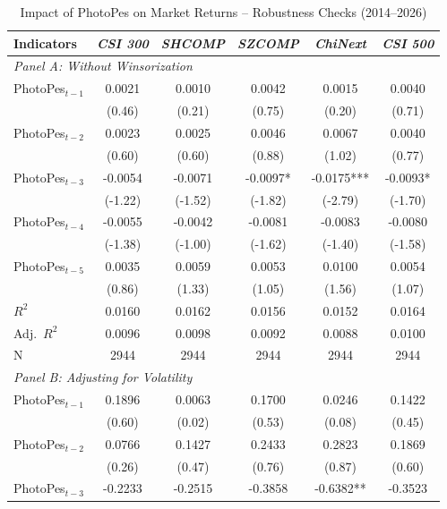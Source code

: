 \documentclass[AER]{AEA}
\begin{document}
\begin{table}[h!]
    \centering
    \caption{Impact of PhotoPes on Market Returns -- Robustness Checks (2014--2026)}
    \label{tab:robustness}
    \setlength{\tabcolsep}{4pt} %
    \footnotesize
    \begin{tabular}{lccccc}
    \toprule
    Indicators & \textit{CSI 300} & \textit{SHCOMP} & \textit{SZCOMP} & \textit{ChiNext} & \textit{CSI 500} \\
    \midrule
    \multicolumn{6}{l}{\textit{Panel A: Without Winsorization}} \\
    \midrule
    PhotoPes$_{t-1}$ & 0.0021 & 0.0010 & 0.0042 & 0.0015 & 0.0040 \\
         & (0.46) & (0.21) & (0.75) & (0.20) & (0.71) \\
    PhotoPes$_{t-2}$ & 0.0023 & 0.0025 & 0.0046 & 0.0067 & 0.0040 \\
         & (0.60) & (0.60) & (0.88) & (1.02) & (0.77) \\
    PhotoPes$_{t-3}$ & -0.0054 & -0.0071 & -0.0097* & -0.0175*** & -0.0093* \\
         & (-1.22) & (-1.52) & (-1.82) & (-2.79) & (-1.70) \\
    PhotoPes$_{t-4}$ & -0.0055 & -0.0042 & -0.0081 & -0.0083 & -0.0080 \\
         & (-1.38) & (-1.00) & (-1.62) & (-1.40) & (-1.58) \\
    PhotoPes$_{t-5}$ & 0.0035 & 0.0059 & 0.0053 & 0.0100 & 0.0054 \\
         & (0.86) & (1.33) & (1.05) & (1.56) & (1.07) \\
    $R^2$ & 0.0160 & 0.0162 & 0.0156 & 0.0152 & 0.0164 \\
    Adj.\ $R^2$ & 0.0096 & 0.0098 & 0.0092 & 0.0088 & 0.0100 \\
    N & 2944 & 2944 & 2944 & 2944 & 2944 \\
    \midrule
    \multicolumn{6}{l}{\textit{Panel B: Adjusting for Volatility}} \\
    \midrule
    PhotoPes$_{t-1}$ & 0.1896 & 0.0063 & 0.1700 & 0.0246 & 0.1422 \\
         & (0.60) & (0.02) & (0.53) & (0.08) & (0.45) \\
    PhotoPes$_{t-2}$ & 0.0766 & 0.1427 & 0.2433 & 0.2823 & 0.1869 \\
         & (0.26) & (0.47) & (0.76) & (0.87) & (0.60) \\
    PhotoPes$_{t-3}$ & -0.2233 & -0.2515 & -0.3858 & -0.6382** & -0.3523 \\

\end{tabular}
\end{table}
\end{document}
